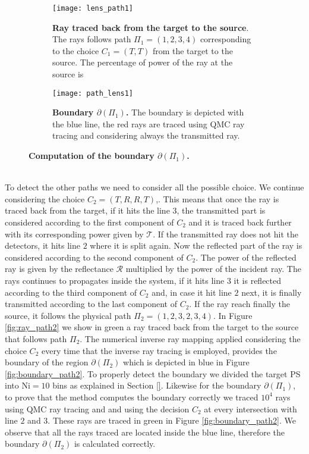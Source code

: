 \begin{figure}[t]
\centering
\begin{subfigure}[t]{.45\textwidth}
  \texttt{[image: lens\_path1]}
 \caption{\textbf{Ray traced back from the target to the source}. The rays follows path $\Pi_1 = (1,2,3,4)$ corresponding to the choice $C_1=(T,T)$ from the target to the source. The percentage of power of the ray at the source is }
  \label{fig:ray_path1}
\end{subfigure}%
\hfill
\begin{subfigure}[t]{.45\textwidth}
  \texttt{[image: path\_lens1]}
  \caption{\textbf{Boundary $\partial$$(\Pi_1)$.} The boundary is depicted with the blue line, the red rays are traced using QMC ray tracing and considering always the transmitted ray.} %
  \label{fig:boundary_path1}
\end{subfigure} %
\caption{\textbf{Computation of the boundary $\partial$$(\Pi_1)$.}}
\end{figure}
\\ \indent To detect the other paths we need to consider all the possible choice. We continue considering the choice $C_2 = (T, R, R, T)$,. This means that once the ray is traced back from the target, if it hits the line $3$, the transmitted part is considered according to the first component of $C_2$ and it is traced back further with its corresponding power given by $\mathcal{T}$. If the transmitted ray does not hit the detectors, it hits line $2$ where it is split again. Now the reflected part of the ray is considered according to the second component of $C_2$. The power of the reflected ray is given by the reflectance $\mathcal{R}$ multiplied by the power of the incident ray. The rays continues to propagates inside the system, if it hits line $3$ it is reflected according to the third component of $C_2$ and, in case it hit line $2$ next, it is finally transmitted according to the last component of $C_2$. If the ray reach finally the source, it follows the physical path $\Pi_2 = (1,2,3,2,3,4)$. 
In Figure \ref{fig:ray_path2} we show in green a ray traced back from the target to the source that follows path $\Pi_2$. The numerical inverse ray mapping applied considering the choice $C_2$ every time that the inverse ray tracing is employed, provides the boundary of the region $\partial$$(\Pi_2)$ which is depicted in blue in Figure \ref{fig:boundary_path2}. To properly detect the boundary we divided the target PS into $\textrm{Ni}=10$ bins as explained in Section \ref{}. Likewise for the boundary $\partial$$(\Pi_1)$, to prove that the method computes the boundary correctly we traced $10^4$ rays using QMC ray tracing and and using the decision $C_2$ at every intersection with line $2$ and $3$. These rays are traced in green in Figure \ref{fig:boundary_path2}. We observe that all the rays traced are located inside the blue line, therefore the boundary $\partial$$(\Pi_2)$ is calculated correctly.
